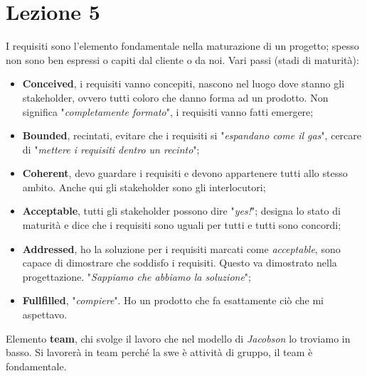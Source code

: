 


\section{Lezione 5}

I requisiti sono l'elemento fondamentale nella maturazione di un progetto; spesso non sono ben espressi o capiti dal cliente o da noi. Vari passi (stadi di maturità):

\begin{itemize}

	\item \textbf{Conceived}, i requisiti vanno concepiti, nascono nel luogo dove stanno gli stakeholder, ovvero tutti coloro che danno forma ad un prodotto. Non significa "\textit{completamente formato}", i requisiti vanno fatti emergere;
	
	\item \textbf{Bounded}, recintati, evitare che i requisiti si "\textit{espandano come il gas}", cercare di "\textit{mettere i requisiti dentro un recinto}";
	
	\item \textbf{Coherent}, devo guardare i requisiti e devono appartenere tutti allo stesso ambito. Anche qui gli stakeholder sono gli interlocutori;
	
	\item \textbf{Acceptable}, tutti gli stakeholder possono dire "\textit{yes!}"; designa lo stato di maturità e dice che i requisiti sono uguali per tutti e tutti sono concordi;
	
	\item \textbf{Addressed}, ho la soluzione per i requisiti marcati come \textit{acceptable}, sono capace di dimostrare che soddisfo i requisiti. Questo va dimostrato nella progettazione. "\textit{Sappiamo che abbiamo la soluzione}";
	
	\item \textbf{Fullfilled}, "\textit{compiere}". Ho un prodotto che fa esattamente ciò che mi aspettavo.

\end{itemize}

Elemento \textbf{team}, chi svolge il lavoro che nel modello di \textit{Jacobson} lo troviamo in basso. Si lavorerà in team perché la swe è attività di gruppo, il team è fondamentale.

